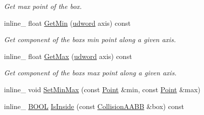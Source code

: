 \begin{DoxyCompactItemize}
\begin{DoxyCompactList}\small\item\em Get max point of the box. \end{DoxyCompactList}\item 
inline\+\_\+ float \hyperlink{classOpcode_1_1CollisionAABB_abca9428684efc9d33c9a98dd24d95267}{Get\+Min} (\hyperlink{IceTypes_8h_a44c6f1920ba5551225fb534f9d1a1733}{udword} axis) const \hypertarget{classOpcode_1_1CollisionAABB_abca9428684efc9d33c9a98dd24d95267}{}\label{classOpcode_1_1CollisionAABB_abca9428684efc9d33c9a98dd24d95267}

\begin{DoxyCompactList}\small\item\em Get component of the box\textquotesingle{}s min point along a given axis. \end{DoxyCompactList}\item 
inline\+\_\+ float \hyperlink{classOpcode_1_1CollisionAABB_ac4eafa31aa5a9c93649ca15f558cde19}{Get\+Max} (\hyperlink{IceTypes_8h_a44c6f1920ba5551225fb534f9d1a1733}{udword} axis) const \hypertarget{classOpcode_1_1CollisionAABB_ac4eafa31aa5a9c93649ca15f558cde19}{}\label{classOpcode_1_1CollisionAABB_ac4eafa31aa5a9c93649ca15f558cde19}

\begin{DoxyCompactList}\small\item\em Get component of the box\textquotesingle{}s max point along a given axis. \end{DoxyCompactList}\item 
inline\+\_\+ void \hyperlink{classOpcode_1_1CollisionAABB_aa418ccf68557d58f539868ea54dfdec4}{Set\+Min\+Max} (const \hyperlink{classOpcode_1_1Point}{Point} \&min, const \hyperlink{classOpcode_1_1Point}{Point} \&max)
\item 
inline\+\_\+ \hyperlink{IceTypes_8h_a050c65e107f0c828f856a231f4b4e788}{B\+O\+OL} \hyperlink{classOpcode_1_1CollisionAABB_a2e4cabf7e8d8f4461b1f4f56391c973c}{Is\+Inside} (const \hyperlink{classOpcode_1_1CollisionAABB}{Collision\+A\+A\+BB} \&box) const 
\end{DoxyCompactItemize}
